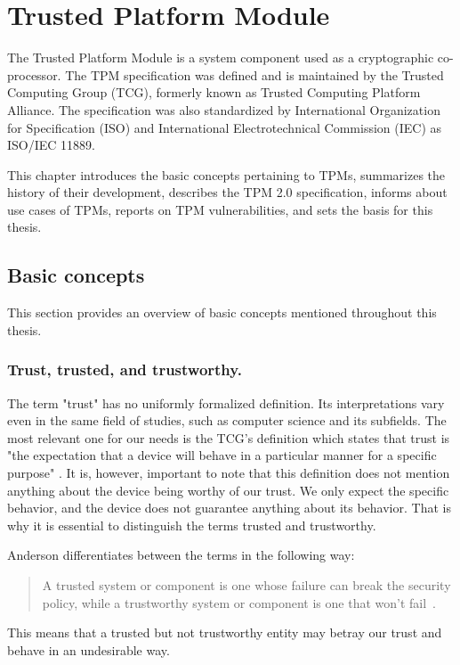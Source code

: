 \chapter{Trusted Platform Module}
The Trusted Platform Module is a system component used as a cryptographic co-processor. The TPM specification was defined and is maintained by the Trusted Computing Group (TCG), formerly known as Trusted Computing Platform Alliance. The specification was also standardized by International Organization for Specification (ISO) and International Electrotechnical Commission (IEC) as ISO/IEC 11889.

This chapter introduces the basic concepts pertaining to TPMs, summarizes the history of their development, describes the TPM 2.0 specification, informs about use cases of TPMs, reports on TPM vulnerabilities, and sets the basis for this thesis.

\section{Basic concepts}
This section provides an overview of basic concepts mentioned throughout this thesis. 

\subsection{Trust, trusted, and trustworthy.}\label{sec:trust-def}
The term "trust" has no uniformly formalized definition. Its interpretations vary even in the same field of studies, such as computer science and its subfields. The most relevant one for our needs is the TCG's definition which states that trust is "the expectation that a device will behave in a particular manner for a specific purpose" \cite{tcg_arch_overview}. It is, however, important to note that this definition does not mention anything about the device being worthy of our trust. We only expect the specific behavior, and the device does not guarantee anything about its behavior. That is why it is essential to distinguish the terms trusted and trustworthy. 

Anderson differentiates between the terms in the following way:
\begin{quote}
A trusted system or component is one whose failure can break the security policy, while a trustworthy system or component is one that won’t fail~\cite{andersonSecEng}.
\end{quote}

This means that a trusted but not trustworthy entity may betray our trust and behave in an undesirable way.

